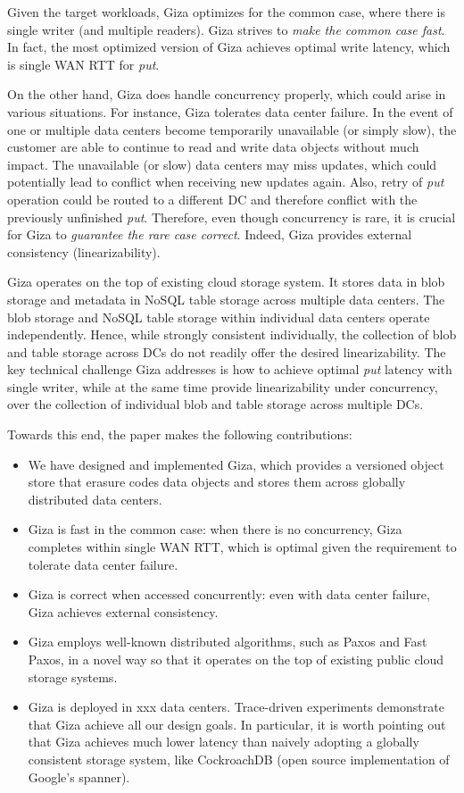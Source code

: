 Given the target workloads, Giza optimizes for the common case, where there is single writer (and multiple readers). Giza strives to {\em make the common case fast}. In fact, the most optimized version of Giza achieves optimal write latency, which is single WAN RTT for {\em put}.

On the other hand, Giza does handle concurrency properly, which could arise in various situations. For instance, Giza tolerates data center failure. In the event of one or multiple data centers become temporarily unavailable (or simply slow), the customer are able to continue to read and write data objects without much impact. The unavailable (or slow) data centers may miss updates, which could potentially lead to conflict when receiving new updates again. Also, retry of {\em put} operation could be routed to a different DC and therefore conflict with the previously unfinished {\em put}. Therefore, even though concurrency is rare, it is crucial for Giza to {\em guarantee the rare case correct}. Indeed, Giza provides external consistency (linearizability).

Giza operates on the top of existing cloud storage system. It stores data in blob storage and metadata in NoSQL table storage across multiple data centers. The blob storage and NoSQL table storage within individual data centers operate independently. Hence, while strongly consistent individually, the collection of blob and table storage across DCs do not readily offer the desired linearizability. The key technical challenge Giza addresses is how to achieve optimal {\em put} latency with single writer, while at the same time provide linearizability under concurrency, over the collection of individual blob and table storage across multiple DCs.

Towards this end, the paper makes the following contributions:
\begin{itemize}
    \item We have designed and implemented Giza, which provides a versioned object store that erasure codes data objects and stores them across globally distributed data centers.
    \item Giza is fast in the common case: when there is no concurrency, Giza completes within single WAN RTT, which is optimal given the requirement to tolerate data center failure.
    \item Giza is correct when accessed concurrently: even with data center failure, Giza achieves external consistency.
    \item Giza employs well-known distributed algorithms, such as Paxos and Fast Paxos, in a novel way so that it operates on the top of existing public cloud storage systems.
    \item Giza is deployed in xxx data centers. Trace-driven experiments demonstrate that Giza achieve all our design goals. In particular, it is worth pointing out that Giza achieves much lower latency than naively adopting a globally consistent storage system, like CockroachDB (open source implementation of Google's spanner).
\end{itemize}
